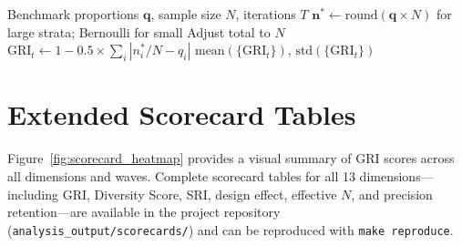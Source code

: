 \documentclass[11pt,a4paper]{article}
\begin{document}
\begin{algorithm}
\caption{Monte Carlo Maximum GRI}\label{alg:mc}
\begin{algorithmic}[1]
\Require Benchmark proportions $\mathbf{q}$, sample size $N$, iterations $T$
    \State $\mathbf{n}^* \gets \text{round}(\mathbf{q} \times N)$ for large strata; Bernoulli for small
    \State Adjust total to $N$
    \State $\text{GRI}_t \gets 1 - 0.5 \times \sum_i |n^*_i/N - q_i|$
\EndFor
\State \Return $\text{mean}(\{\text{GRI}_t\})$, $\text{std}(\{\text{GRI}_t\})$
\end{algorithmic}
\end{algorithm}

\section{Extended Scorecard Tables}\label{app:tables}

Figure~\ref{fig:scorecard_heatmap} provides a visual summary of GRI scores across all dimensions and waves. Complete scorecard tables for all 13 dimensions---including GRI, Diversity Score, SRI, design effect, effective $N$, and precision retention---are available in the project repository (\texttt{analysis\_output/scorecards/}) and can be reproduced with \texttt{make reproduce}.
\end{document}
